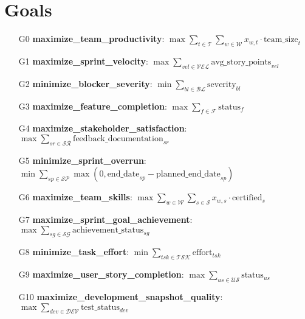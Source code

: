 \documentclass{article}
\begin{document}
\section{Goals}
\begin{itemize}
    \item[G0] \textbf{maximize\_team\_productivity}: $\max \sum_{t \in \mathcal{T}} \sum_{w \in \mathcal{W}} x_{w,t} \cdot \text{team\_size}_t$
    \item[G1] \textbf{maximize\_sprint\_velocity}: $\max \sum_{vel \in \mathcal{VEL}} \text{avg\_story\_points}_{vel}$
    \item[G2] \textbf{minimize\_blocker\_severity}: $\min \sum_{bl \in \mathcal{BL}} \text{severity}_{bl}$
    \item[G3] \textbf{maximize\_feature\_completion}: $\max \sum_{f \in \mathcal{F}} \text{status}_f$
    \item[G4] \textbf{maximize\_stakeholder\_satisfaction}: $\max \sum_{sr \in \mathcal{SR}} \text{feedback\_documentation}_{sr}$
    \item[G5] \textbf{minimize\_sprint\_overrun}: $\min \sum_{sp \in \mathcal{SP}} \max(0, \text{end\_date}_{sp} - \text{planned\_end\_date}_{sp})$
    \item[G6] \textbf{maximize\_team\_skills}: $\max \sum_{w \in \mathcal{W}} \sum_{s \in \mathcal{S}} x_{w,s} \cdot \text{certified}_s$
    \item[G7] \textbf{maximize\_sprint\_goal\_achievement}: $\max \sum_{sg \in \mathcal{SG}} \text{achievement\_status}_{sg}$
    \item[G8] \textbf{minimize\_task\_effort}: $\min \sum_{tsk \in \mathcal{TSK}} \text{effort}_{tsk}$
    \item[G9] \textbf{maximize\_user\_story\_completion}: $\max \sum_{us \in \mathcal{US}} \text{status}_{us}$
    \item[G10] \textbf{maximize\_development\_snapshot\_quality}: $\max \sum_{dev \in \mathcal{DEV}} \text{test\_status}_{dev}$
\end{itemize}
\end{document}
